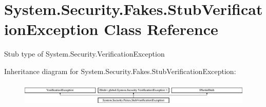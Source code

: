 \hypertarget{class_system_1_1_security_1_1_fakes_1_1_stub_verification_exception}{\section{System.\-Security.\-Fakes.\-Stub\-Verification\-Exception Class Reference}
\label{class_system_1_1_security_1_1_fakes_1_1_stub_verification_exception}
}


Stub type of System.\-Security.\-Verification\-Exception 


Inheritance diagram for System.\-Security.\-Fakes.\-Stub\-Verification\-Exception\-:\begin{figure}[H]
\begin{center}
\leavevmode
\includegraphics[height=1.148718cm]{class_system_1_1_security_1_1_fakes_1_1_stub_verification_exception}
\end{center}
\end{figure}

